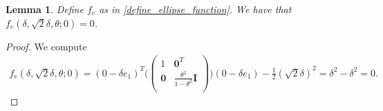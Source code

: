 \documentclass{article}
\newtheorem{lemma}[theorem]{Lemma}
\theoremstyle{case}
\begin{document}
\begin{lemma}
\label{ellipse_fits}
Define $f_e$ as in \cref{define_ellipse_function}.
We have that $f_e(\delta, \sqrt{2}\delta, \theta; 0) = 0$.
\end{lemma}
\begin{proof}
We compute
\begin{align*}
f_e(\delta, \sqrt{2}\delta, \theta; 0) =(0 - \delta e_1)^T\bigg(\begin{pmatrix}
1 & \boldsymbol0^T \\
\boldsymbol 0 & \frac{\theta^2}{1 - \theta^2} \boldsymbol I \\
\end{pmatrix}\bigg)(0 - \delta e_1) - \frac 1 2 (\sqrt 2 \delta)^2
=\delta^2 - \delta^2 = 0.
\end{align*}
\end{proof}
\end{document}

